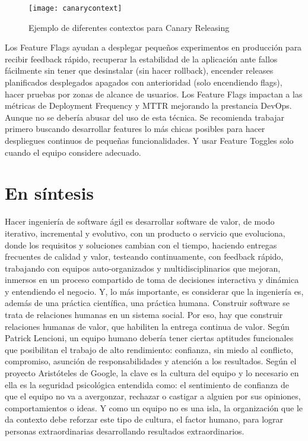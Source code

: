 \begin{itemize}
\begin{figure}[h]
  \centering
  \texttt{[image: canarycontext]}
  \caption{Ejemplo de diferentes contextos para Canary Releasing}
  \centering
  \label{fig:canarycontext} %
\end{figure}
\FloatBarrier %

\end{itemize}

Los Feature Flags ayudan a desplegar pequeños experimentos en producción para recibir feedback rápido, recuperar la estabilidad de la aplicación ante fallos fácilmente sin tener que desinstalar (sin hacer rollback), encender releases planificados desplegados apagados con anterioridad (solo encendiendo flags), hacer pruebas por zonas de alcance de usuarios. Los Feature Flags impactan a las métricas de Deployment Frequency y MTTR mejorando la prestancia DevOps. Aunque no se debería abusar del uso de esta técnica. Se recomienda trabajar primero buscando desarrollar features lo más chicas posibles para hacer despliegues continuos de pequeñas funcionalidades. Y usar Feature Toggles solo cuando el equipo considere adecuado.

\section{En síntesis}

Hacer ingeniería de software ágil es desarrollar software de valor, de modo iterativo, incremental y evolutivo, con un producto o servicio que evoluciona, donde los requisitos y soluciones cambian con el tiempo, haciendo entregas frecuentes de calidad y valor, testeando continuamente, con feedback rápido, trabajando con equipos auto-organizados y multidisciplinarios que mejoran, inmersos en un proceso compartido de toma de decisiones interactiva y dinámica y entendiendo el negocio. Y, lo más importante, es considerar que la ingeniería es, además de una práctica científica, una práctica humana. Construir software se trata de relaciones humanas en un sistema social. Por eso, hay que construir relaciones humanas de valor, que habiliten la entrega continua de valor. Según Patrick Lencioni, un equipo humano debería tener ciertas aptitudes funcionales que posibilitan el trabajo de alto rendimiento: confianza, sin miedo al conflicto, compromiso, asunción de responsabilidades y atención a los resultados. Según el proyecto Aristóteles de Google, la clave es la cultura del equipo y lo necesario en ella es la seguridad psicológica entendida como: el sentimiento de confianza de que el equipo no va a avergonzar, rechazar o castigar a alguien por sus opiniones, comportamientos o ideas. Y como un equipo no es una isla, la organización que le da contexto debe reforzar este tipo de cultura, el factor humano, para lograr personas extraordinarias desarrollando resultados extraordinarios.
